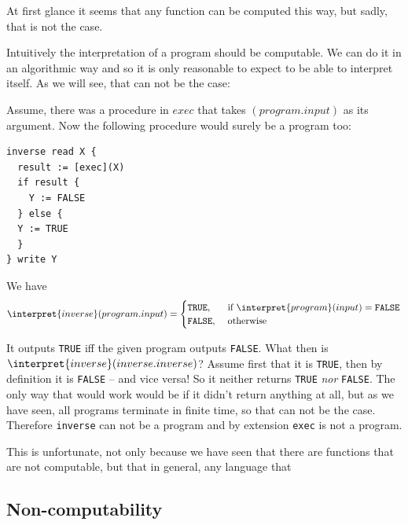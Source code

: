 
At first glance it seems that any function can be computed this way, but 
sadly, that is not the case.

\begin{theorem}
Intuitively the interpretation of a \FOR program should be computable. We can 
do it in an algorithmic way and so it is only reasonable to expect \FOR to be 
able to interpret itself. As we will see, that can not be the case:

Assume, there was a procedure in \FOR $exec$ that takes $(program.input)$ as 
its argument. Now the following procedure would surely be a \FOR program too:

\begin{verbatim}
inverse read X {
  result := [exec](X)
  if result {
    Y := FALSE
  } else {
  Y := TRUE
  }
} write Y
\end{verbatim}

We have 
\[ \interpret{inverse}(program.input) = \begin{cases}
		\mathtt{TRUE}, &\text{ if }\interpret{program}(input) = \mathtt{FALSE} \\
		\mathtt{FALSE}, &\text{ otherwise }
	\end{cases} \]

It outputs {\tt TRUE} iff the given program outputs {\tt FALSE}. What then 
is $\interpret{inverse}(inverse.inverse)$? Assume first that it is 
{\tt TRUE}, then by definition it is {\tt FALSE} -- and vice versa! So it 
neither returns {\tt TRUE} {\em nor} {\tt FALSE}. The only way that would 
work would be if it didn't return anything at all, but as we have seen, all 
\FOR programs terminate in finite time, so that can not be the case. 
Therefore {\tt inverse} can not be a \FOR program and by extension {\tt exec} 
is not a \FOR program.
\end{theorem}


This is unfortunate, not only because we have seen that there are functions 
that are not \FOR computable, but that in general, any language that 

\subsection{Non-\FOR computability}
